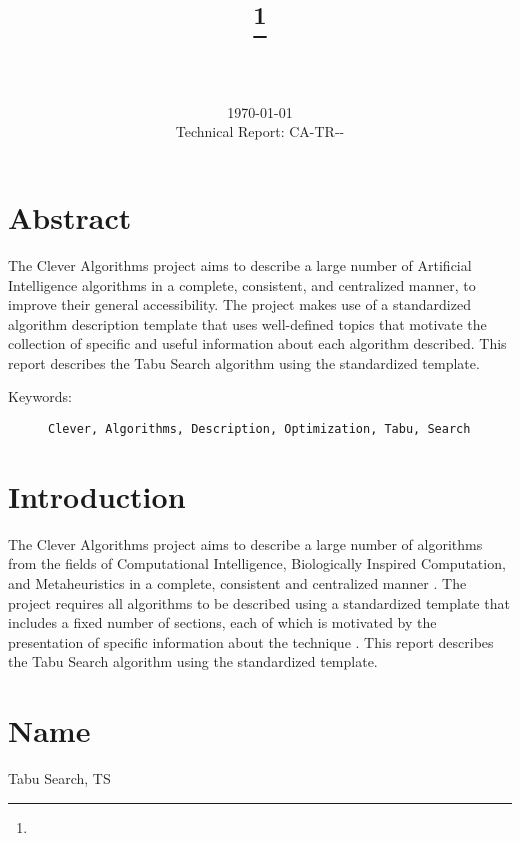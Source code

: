 \documentclass[a4paper, 11pt]{article}
\title{{\myreporttitle}\footnote{\myreportlicense}}
\author{\myreportauthor\\{\myreportemail}\\\small\myreportproject}
\date{\today\\{\small{Technical Report: CA-TR-{\myreportdate}-\myreportversion}}}
\begin{document}
\maketitle

\section*{Abstract} 
The Clever Algorithms project aims to describe a large number of Artificial Intelligence algorithms in a complete, consistent, and centralized manner, to improve their general accessibility. 
The project makes use of a standardized algorithm description template that uses well-defined topics that motivate the collection of specific and useful information about each algorithm described.
This report describes the Tabu Search algorithm using the standardized template. 

\begin{description}
	\item[Keywords:] {\small\texttt{Clever, Algorithms, Description, Optimization, Tabu, Search}}
\end{description} 

\section{Introduction} 
\label{sec:intro}
The Clever Algorithms project aims to describe a large number of algorithms from the fields of Computational Intelligence, Biologically Inspired Computation, and Metaheuristics in a complete, consistent and centralized manner \cite{Brownlee2010}.
The project requires all algorithms to be described using a standardized template that includes a fixed number of sections, each of which is motivated by the presentation of specific information about the technique \cite{Brownlee2010a}.
This report describes the Tabu Search algorithm using the standardized template.

\section{Name} 
\label{sec:name}
Tabu Search, TS
\end{document}

